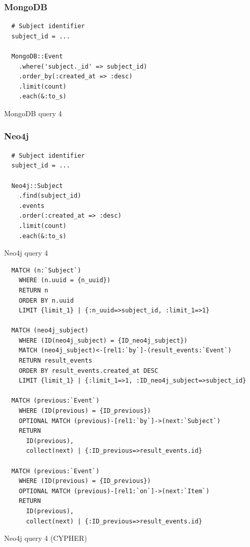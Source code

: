 \subsubsection*{MongoDB}

\begin{listing}[H]
  \begin{verbatim}
  # Subject identifier
  subject_id = ...

  MongoDB::Event
    .where('subject._id' => subject_id)
    .order_by(:created_at => :desc)
    .limit(count)
    .each(&:to_s)
  \end{verbatim}

  \caption{MongoDB query 4}
  \label{lst:mongodb-query-4}
\end{listing}

\subsubsection*{Neo4j}

\begin{listing}[H]
  \begin{verbatim}
  # Subject identifier
  subject_id = ...

  Neo4j::Subject
    .find(subject_id)
    .events
    .order(:created_at => :desc)
    .limit(count)
    .each(&:to_s)
  \end{verbatim}

  \caption{Neo4j query 4}
  \label{lst:neo4j-query-4}
\end{listing}

\begin{listing}[H]
  \begin{verbatim}
  MATCH (n:`Subject`)
    WHERE (n.uuid = {n_uuid})
    RETURN n
    ORDER BY n.uuid
    LIMIT {limit_1} | {:n_uuid=>subject_id, :limit_1=>1}

  MATCH (neo4j_subject)
    WHERE (ID(neo4j_subject) = {ID_neo4j_subject})
    MATCH (neo4j_subject)<-[rel1:`by`]-(result_events:`Event`)
    RETURN result_events
    ORDER BY result_events.created_at DESC
    LIMIT {limit_1} | {:limit_1=>1, :ID_neo4j_subject=>subject_id}

  MATCH (previous:`Event`)
    WHERE (ID(previous) = {ID_previous})
    OPTIONAL MATCH (previous)-[rel1:`by`]->(next:`Subject`)
    RETURN
      ID(previous),
      collect(next) | {:ID_previous=>result_events.id}

  MATCH (previous:`Event`)
    WHERE (ID(previous) = {ID_previous})
    OPTIONAL MATCH (previous)-[rel1:`on`]->(next:`Item`)
    RETURN
      ID(previous),
      collect(next) | {:ID_previous=>result_events.id}
  \end{verbatim}

  \caption{Neo4j query 4 (CYPHER)}
  \label{lst:neo4j-query-4}
\end{listing}

